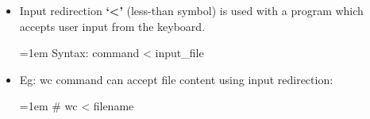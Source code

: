 \setlength{\columnsep}{3pt}
\begin{flushleft}
	\begin{itemize}
		\item Input redirection \textbf{‘<’} (less-than symbol) is used with a program which accepts user input from the keyboard. 
		\bigskip
		\begin{tcolorbox}[breakable,notitle,boxrule=-0pt,colback=pink,colframe=pink]
			\color{black}
			\font=1em
			Syntax: command < input\_file
			\font=4pt
		\end{tcolorbox}
		\item
		Eg: wc command can accept file content using input redirection:
		\bigskip
		\begin{tcolorbox}[breakable,notitle,boxrule=-0pt,colback=black,colframe=black]
			\color{green}
			\font=1em
			\# wc < filename
			\font=4pt
		\end{tcolorbox}
	\end{itemize}
	


	
\end{flushleft}

